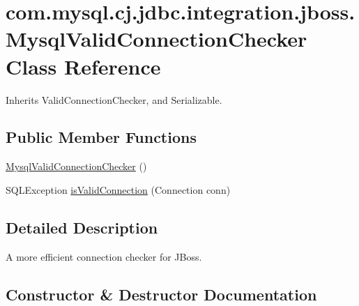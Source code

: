 \hypertarget{classcom_1_1mysql_1_1cj_1_1jdbc_1_1integration_1_1jboss_1_1_mysql_valid_connection_checker}{}\section{com.\+mysql.\+cj.\+jdbc.\+integration.\+jboss.\+Mysql\+Valid\+Connection\+Checker Class Reference}
\label{classcom_1_1mysql_1_1cj_1_1jdbc_1_1integration_1_1jboss_1_1_mysql_valid_connection_checker}


Inherits Valid\+Connection\+Checker, and Serializable.

\subsection*{Public Member Functions}
\begin{DoxyCompactItemize}
\item 
\mbox{\hyperlink{classcom_1_1mysql_1_1cj_1_1jdbc_1_1integration_1_1jboss_1_1_mysql_valid_connection_checker_a1243f000308ead122221fd86c5238994}{Mysql\+Valid\+Connection\+Checker}} ()
\item 
S\+Q\+L\+Exception \mbox{\hyperlink{classcom_1_1mysql_1_1cj_1_1jdbc_1_1integration_1_1jboss_1_1_mysql_valid_connection_checker_a1128671b67d25ea87ad6f48b371d48a4}{is\+Valid\+Connection}} (Connection conn)
\end{DoxyCompactItemize}


\subsection{Detailed Description}
A more efficient connection checker for J\+Boss. 

\subsection{Constructor \& Destructor Documentation}
\mbox{\label{classcom_1_1mysql_1_1cj_1_1jdbc_1_1integration_1_1jboss_1_1_mysql_valid_connection_checker_a1243f000308ead122221fd86c5238994}} 
